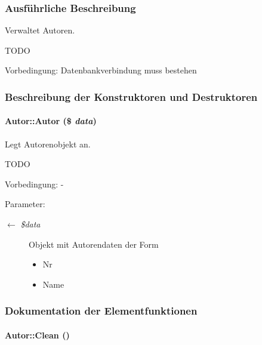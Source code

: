 \subsubsection{Ausf\"{u}hrliche Beschreibung}
Verwaltet Autoren. 

TODO \begin{Desc}
\item[Vorbedingung:]Datenbankverbindung muss bestehen \end{Desc}




\subsubsection{Beschreibung der Konstruktoren und Destruktoren}
\hypertarget{classAutor_2302710dd8970853f5d49c62d4586e8f}{
\paragraph[Autor]{\setlength{\rightskip}{0pt plus 5cm}Autor::Autor (\$ {\em data})}\hfill}
\label{classAutor_2302710dd8970853f5d49c62d4586e8f}


Legt Autorenobjekt an. 

TODO \begin{Desc}
\item[Vorbedingung:]- \end{Desc}
\begin{Desc}
\item[Parameter:]
\begin{description}
\item[\mbox{$\leftarrow$} {\em \$data}]Objekt mit Autorendaten der Form\begin{itemize}
\item Nr\item Name \end{itemize}
\end{description}
\end{Desc}


\subsubsection{Dokumentation der Elementfunktionen}
\hypertarget{classAutor_77b27af7e471abe5a404fc92c7319921}{
\paragraph[Clean]{\setlength{\rightskip}{0pt plus 5cm}Autor::Clean ()}\hfill}
\label{classAutor_77b27af7e471abe5a404fc92c7319921}


